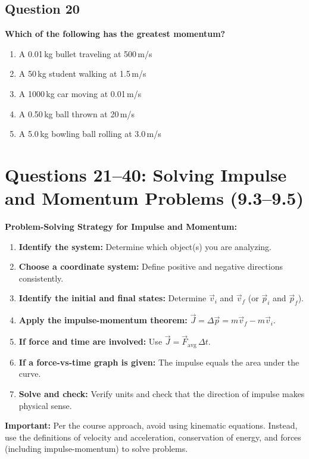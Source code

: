 \documentclass[12pt,letterpaper]{article}
\begin{document}
\subsection{Question 20}

\begin{questionbox}
\textbf{Which of the following has the greatest momentum?}

\begin{enumerate}[label=\alph*)]
    \item A 0.01\,kg bullet traveling at 500\,m/s
    \item A 50\,kg student walking at 1.5\,m/s
    \item A 1000\,kg car moving at 0.01\,m/s
    \item A 0.50\,kg ball thrown at 20\,m/s
    \item A 5.0\,kg bowling ball rolling at 3.0\,m/s
\end{enumerate}
\end{questionbox}

\section{Questions 21--40: Solving Impulse and Momentum Problems (9.3--9.5)}

\begin{conceptbox}
\textbf{Problem-Solving Strategy for Impulse and Momentum:}
\begin{enumerate}
\item \textbf{Identify the system:} Determine which object(s) you are analyzing.
\item \textbf{Choose a coordinate system:} Define positive and negative directions consistently.
\item \textbf{Identify the initial and final states:} Determine $\vec{v}_i$ and $\vec{v}_f$ (or $\vec{p}_i$ and $\vec{p}_f$).
\item \textbf{Apply the impulse-momentum theorem:} $\vec{J} = \Delta\vec{p} = m\vec{v}_f - m\vec{v}_i$.
\item \textbf{If force and time are involved:} Use $\vec{J} = \vec{F}_{\text{avg}}\,\Delta t$.
\item \textbf{If a force-vs-time graph is given:} The impulse equals the area under the curve.
\item \textbf{Solve and check:} Verify units and check that the direction of impulse makes physical sense.
\end{enumerate}

\textbf{Important:} Per the course approach, avoid using kinematic equations. Instead, use the definitions of velocity and acceleration, conservation of energy, and forces (including impulse-momentum) to solve problems.
\end{conceptbox}
\end{document}
